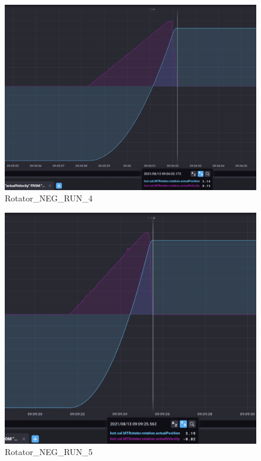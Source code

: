 \documentclass[SE,lsstdraft,authoryear,toc]{lsstdoc}
\begin{document}
\begin{figure}
  \includegraphics[width=\linewidth]{media/rotator_neg_4.png}
  \caption{Rotator\_NEG\_RUN\_4}
  \label{fig:Rotator_NEG_RUN_4}
\end{figure}

\begin{figure}
  \includegraphics[width=\linewidth]{media/rotator_neg_5.png}
  \caption{Rotator\_NEG\_RUN\_5}
  \label{fig:Rotator_NEG_RUN_5}
\end{figure}
\end{document}
